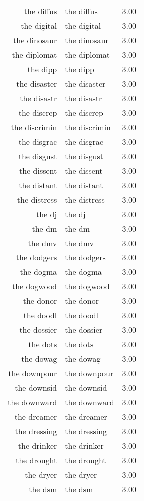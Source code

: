 \begin{table}[ht]
\begin{tabular}{rlr}
  the diffus & the diffus & 3.00 \\ 
  the digital & the digital & 3.00 \\ 
  the dinosaur & the dinosaur & 3.00 \\ 
  the diplomat & the diplomat & 3.00 \\ 
  the dipp & the dipp & 3.00 \\ 
  the disaster & the disaster & 3.00 \\ 
  the disastr & the disastr & 3.00 \\ 
  the discrep & the discrep & 3.00 \\ 
  the discrimin & the discrimin & 3.00 \\ 
  the disgrac & the disgrac & 3.00 \\ 
  the disgust & the disgust & 3.00 \\ 
  the dissent & the dissent & 3.00 \\ 
  the distant & the distant & 3.00 \\ 
  the distress & the distress & 3.00 \\ 
  the dj & the dj & 3.00 \\ 
  the dm & the dm & 3.00 \\ 
  the dmv & the dmv & 3.00 \\ 
  the dodgers & the dodgers & 3.00 \\ 
  the dogma & the dogma & 3.00 \\ 
  the dogwood & the dogwood & 3.00 \\ 
  the donor & the donor & 3.00 \\ 
  the doodl & the doodl & 3.00 \\ 
  the dossier & the dossier & 3.00 \\ 
  the dots & the dots & 3.00 \\ 
  the dowag & the dowag & 3.00 \\ 
  the downpour & the downpour & 3.00 \\ 
  the downsid & the downsid & 3.00 \\ 
  the downward & the downward & 3.00 \\ 
  the dreamer & the dreamer & 3.00 \\ 
  the dressing & the dressing & 3.00 \\ 
  the drinker & the drinker & 3.00 \\ 
  the drought & the drought & 3.00 \\ 
  the dryer & the dryer & 3.00 \\ 
  the dsm & the dsm & 3.00 \\ 

\end{tabular}
\end{table}
